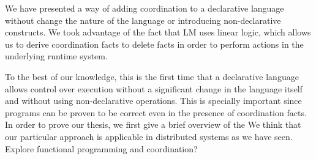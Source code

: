 We have presented a way of adding coordination to a declarative language without
change the nature of the language or introducing non-declarative constructs. We
took advantage of the fact that LM uses linear logic, which allows us to derive
coordination facts to delete facts in order to perform actions in the underlying
runtime system.

To the best of our knowledge, this is the first time that a declarative language allows 
control over execution without a significant change in the language itself and
without using non-declarative operations. This is specially important since
programs can be proven to be correct even in the presence of coordination facts.
In order to prove our thesis, we first give a brief overview of the
We think that our particular approach is applicable in distributed systems as we
have seen. Explore functional programming and coordination?
